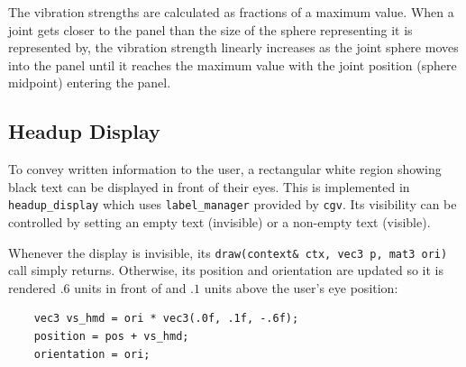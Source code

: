 \documentclass[hyperref, bachelorofscience]{cgvpub}
\begin{document}
The vibration strengths are calculated as fractions of a maximum value. When a joint gets closer to the panel than the size of the sphere representing it is represented by, the vibration strength linearly increases as the joint sphere moves into the panel until it reaches the maximum value with the joint position (sphere midpoint) entering the panel.

\subsection{Headup Display} \label{sec:hd}
To convey written information to the user, a rectangular white region showing black text can be displayed in front of their eyes. This is implemented in \lstinline|headup_display| which uses \lstinline|label_manager| provided by \lstinline|cgv|. Its visibility can be controlled by setting an empty text (invisible) or a non-empty text (visible).

Whenever the display is invisible, its \lstinline|draw(context& ctx, vec3 p, mat3 ori)| call simply returns. Otherwise, its position and orientation are updated so it is rendered $ .6 $ units in front of and $ .1 $ units above the user's eye position:
\begin{lstlisting}
	vec3 vs_hmd = ori * vec3(.0f, .1f, -.6f);
	position = pos + vs_hmd;
	orientation = ori;
\end{lstlisting}
\end{document}
